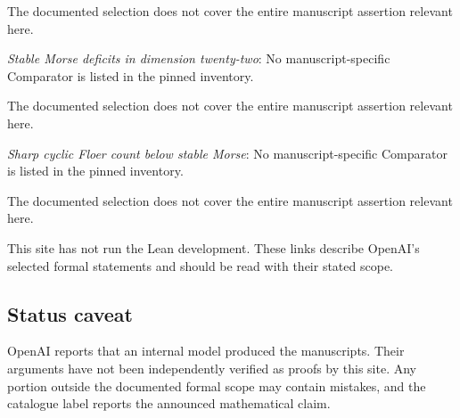 \documentclass[11pt]{article}
\begin{document}
The documented selection does not cover the entire manuscript assertion relevant here.

\textit{Stable Morse deficits in dimension twenty-two}: No manuscript-specific Comparator is listed in the pinned inventory.

The documented selection does not cover the entire manuscript assertion relevant here.

\textit{Sharp cyclic Floer count below stable Morse}: No manuscript-specific Comparator is listed in the pinned inventory.

The documented selection does not cover the entire manuscript assertion relevant here.

This site has not run the Lean development. These links describe OpenAI’s selected formal statements and should be read with their stated scope.

\subsection{Status caveat}
OpenAI reports that an internal model produced the manuscripts. Their arguments have not been independently verified as proofs by this site. Any portion outside the documented formal scope may contain mistakes, and the catalogue label reports the announced mathematical claim.
\end{document}
